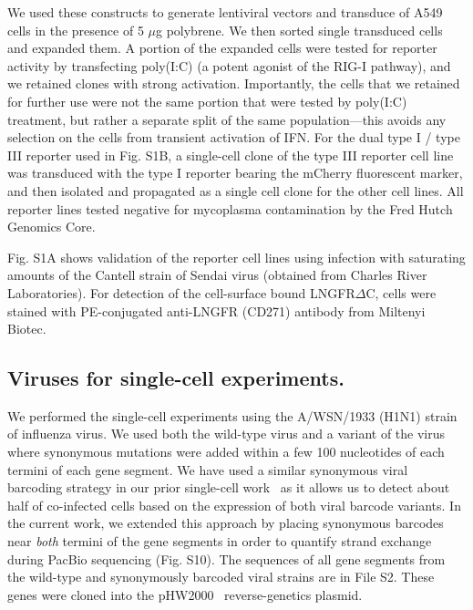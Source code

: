 \documentclass[]{article}
\begin{document}
We used these constructs to generate lentiviral vectors and transduce of A549 cells in the presence of 5 $\mu$g polybrene.
We then sorted single transduced cells and expanded them.
A portion of the expanded cells were tested for reporter activity by transfecting poly(I:C) (a potent agonist of the RIG-I pathway), and we retained clones with strong activation.
Importantly, the cells that we retained for further use were not the same portion that were tested by poly(I:C) treatment, but rather a separate split of the same population---this avoids any selection on the cells from transient activation of IFN.
For the dual type I / type III reporter used in Fig. S1B, a single-cell clone of the type III reporter cell line was transduced with the type I reporter bearing the mCherry fluorescent marker, and then isolated and propagated as a single cell clone for the other cell lines.
All reporter lines tested negative for mycoplasma contamination by the Fred Hutch Genomics Core.

Fig. S1A shows validation of the reporter cell lines using infection with saturating amounts of the Cantell strain of Sendai virus (obtained from Charles River Laboratories).
For detection of the cell-surface bound LNGFR$\Delta$C, cells were stained with PE-conjugated anti-LNGFR (CD271) antibody from Miltenyi Biotec.

\subsection*{Viruses for single-cell experiments.}
We performed the single-cell experiments using the A/WSN/1933 (H1N1) strain of influenza virus.
We used both the wild-type virus and a variant of the virus where synonymous mutations were added within a few 100 nucleotides of each termini of each gene segment.
We have used a similar synonymous viral barcoding strategy in our prior single-cell work~\cite{russell2018extreme} as it allows us to detect about half of co-infected cells based on the expression of both viral barcode variants.
In the current work, we extended this approach by placing synonymous barcodes near \emph{both} termini of the gene segments in order to quantify strand exchange during PacBio sequencing (Fig. S10).
The sequences of all gene segments from the wild-type and synonymously barcoded viral strains are in File S2.
These genes were cloned into the pHW2000~\cite{hoffmann2000dna} reverse-genetics plasmid.
\end{document}
